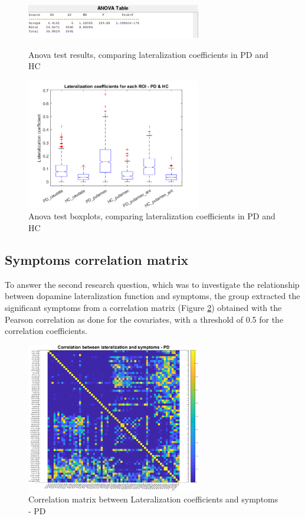 \documentclass[]{article}
\begin{document}
\begin{figure}[h]
	\centering
	\parbox{2.8in}{
		\centering
		\includegraphics[width=3in]{../anova_table_lat_hc_pd}
		\caption{Anova test results, comparing lateralization coefficients in PD and HC}
		\label{fig:anova_table}}
	\begin{minipage}{2.8in}
		\centering
		\includegraphics[width=3in]{../anova_plot_lat_hc_pd}
		\caption{Anova test boxplots, comparing lateralization coefficients in PD and HC}
		\label{fig:anova_plot}
	\end{minipage}
\end{figure}

\begin{multicols}{2}

\subsection{Symptoms correlation matrix}

To answer the second research question, which was to investigate the relationship between dopamine lateralization function and symptoms, the group extracted the significant symptoms from a correlation matrix (Figure \ref{fig:corr_symp_pd}) obtained with the Pearson correlation as done for the covariates, with a threshold of 0.5 for the correlation coefficients. 

\end{multicols}

\begin{figure}[h]
	\centering
	\includegraphics[width=3in]{../corr_mat_symptoms_pd}
	\caption{Correlation matrix between Lateralization coefficients and symptoms - PD}
	\label{fig:corr_symp_pd}
\end{figure} 
\end{document}
